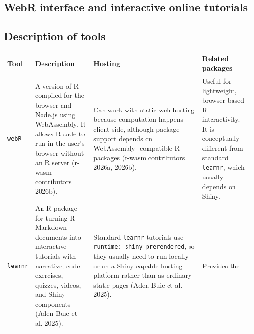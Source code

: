 \documentclass[
  letterpaper,
  DIV=11,
  numbers=noendperiod]{scrartcl}
\begin{document}
\subsection{WebR interface and interactive online
tutorials}\label{webr-interface-and-interactive-online-tutorials}

\subsection{Description of tools}\label{description-of-tools}

\begin{longtable}[]{@{}
  >{\raggedright\arraybackslash}p{}
  >{\raggedright\arraybackslash}p{}
  >{\raggedright\arraybackslash}p{}
  >{\raggedright\arraybackslash}p{}@{}}
\toprule\noalign{}
\begin{minipage}[b]{\linewidth}\raggedright
Tool
\end{minipage} & \begin{minipage}[b]{\linewidth}\raggedright
Description
\end{minipage} & \begin{minipage}[b]{\linewidth}\raggedright
Hosting
\end{minipage} & \begin{minipage}[b]{\linewidth}\raggedright
Related packages
\end{minipage} \\
\midrule\noalign{}
\endhead
\bottomrule\noalign{}
\endlastfoot
\texttt{webR} & A version of R compiled for the browser and Node.js
using WebAssembly. It allows R code to run in the user's browser without
an R server (r-wasm contributors 2026b). & Can work with static web
hosting because computation happens client-side, although package
support depends on WebAssembly- compatible R packages (r-wasm
contributors 2026a, 2026b). & Useful for lightweight, browser-based R
interactivity. It is conceptually different from standard
\texttt{learnr}, which usually depends on Shiny. \\
\texttt{learnr} & An R package for turning R Markdown documents into
interactive tutorials with narrative, code exercises, quizzes, videos,
and Shiny components (Aden-Buie et al. 2025). & Standard \texttt{learnr}
tutorials use \texttt{runtime:\ shiny\_prerendered}, so they usually
need to run locally or on a Shiny-capable hosting platform rather than
as ordinary static pages (Aden-Buie et al. 2025). & Provides the

\end{longtable}
\end{document}
